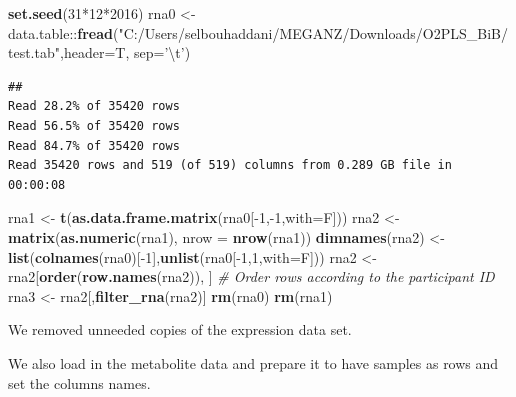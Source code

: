 \documentclass[]{article}
\newenvironment{Shaded}{\begin{snugshade}}{\end{snugshade}}
\newcommand{\KeywordTok}[1]{\textcolor[rgb]{0.13,0.29,0.53}{\textbf{{#1}}}}
\newcommand{\DataTypeTok}[1]{\textcolor[rgb]{0.13,0.29,0.53}{{#1}}}
\newcommand{\DecValTok}[1]{\textcolor[rgb]{0.00,0.00,0.81}{{#1}}}
\newcommand{\CharTok}[1]{\textcolor[rgb]{0.31,0.60,0.02}{{#1}}}
\newcommand{\StringTok}[1]{\textcolor[rgb]{0.31,0.60,0.02}{{#1}}}
\newcommand{\CommentTok}[1]{\textcolor[rgb]{0.56,0.35,0.01}{\textit{{#1}}}}
\newcommand{\NormalTok}[1]{{#1}}
\begin{document}
\begin{Shaded}
\begin{Highlighting}[]
\KeywordTok{set.seed}\NormalTok{(}\DecValTok{31}\NormalTok{*}\DecValTok{12}\NormalTok{*}\DecValTok{2016}\NormalTok{)}
\NormalTok{rna0 <-}\StringTok{ }\NormalTok{data.table::}\KeywordTok{fread}\NormalTok{(}\StringTok{"C:/Users/selbouhaddani/MEGANZ/Downloads/O2PLS_BiB/test.tab"}\NormalTok{,}\DataTypeTok{header=}\NormalTok{T, }\DataTypeTok{sep=}\StringTok{'}\CharTok{\textbackslash{}t}\StringTok{'}\NormalTok{)}
\end{Highlighting}
\end{Shaded}

\begin{verbatim}
## 
Read 28.2% of 35420 rows
Read 56.5% of 35420 rows
Read 84.7% of 35420 rows
Read 35420 rows and 519 (of 519) columns from 0.289 GB file in 00:00:08
\end{verbatim}

\begin{Shaded}
\begin{Highlighting}[]
\NormalTok{rna1 <-}\StringTok{ }\KeywordTok{t}\NormalTok{(}\KeywordTok{as.data.frame.matrix}\NormalTok{(rna0[-}\DecValTok{1}\NormalTok{,-}\DecValTok{1}\NormalTok{,}\DataTypeTok{with=}\NormalTok{F]))}
\NormalTok{rna2 <-}\StringTok{ }\KeywordTok{matrix}\NormalTok{(}\KeywordTok{as.numeric}\NormalTok{(rna1), }\DataTypeTok{nrow =} \KeywordTok{nrow}\NormalTok{(rna1))}
\KeywordTok{dimnames}\NormalTok{(rna2) <-}\StringTok{ }\KeywordTok{list}\NormalTok{(}\KeywordTok{colnames}\NormalTok{(rna0)[-}\DecValTok{1}\NormalTok{],}\KeywordTok{unlist}\NormalTok{(rna0[-}\DecValTok{1}\NormalTok{,}\DecValTok{1}\NormalTok{,}\DataTypeTok{with=}\NormalTok{F]))}
\NormalTok{rna2 <-}\StringTok{ }\NormalTok{rna2[}\KeywordTok{order}\NormalTok{(}\KeywordTok{row.names}\NormalTok{(rna2)), ] }\CommentTok{# Order rows according to the participant ID}
\NormalTok{rna3 <-}\StringTok{ }\NormalTok{rna2[,}\KeywordTok{filter_rna}\NormalTok{(rna2)]}
\KeywordTok{rm}\NormalTok{(rna0)}
\KeywordTok{rm}\NormalTok{(rna1)}
\end{Highlighting}
\end{Shaded}

We removed unneeded copies of the expression data set.

We also load in the metabolite data and prepare it to have samples as
rows and set the columns names.

\begin{Shaded}
\end{Shaded}
\end{document}
